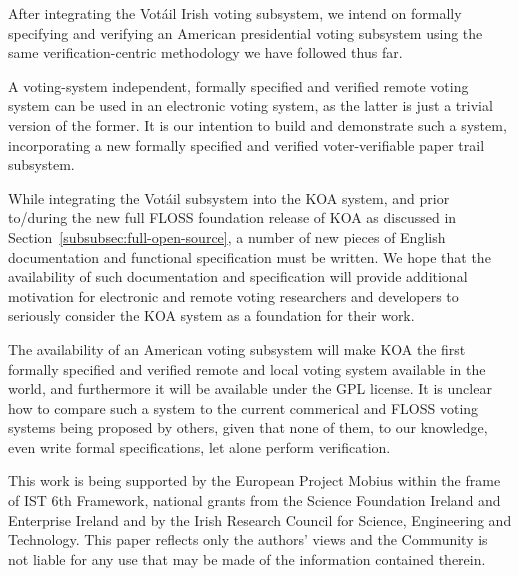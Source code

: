 \documentclass[times, 10pt, twocolumn]{article}
\newcommand{\Votail}{Vot{\'a}il\xspace}
\begin{document}
After integrating the \Votail Irish voting subsystem, we intend on
formally specifying and verifying an American presidential voting
subsystem using the same verification-centric methodology we have
followed thus far.


A voting-system independent, formally specified and verified remote
voting system can be used in an electronic voting system, as the
latter is just a trivial version of the former.  It is our intention
to build and demonstrate such a system, incorporating a new formally
specified and verified voter-verifiable paper trail subsystem.

\label{sec:conclusion}

While integrating the \Votail subsystem into the KOA system, and prior 
to/during the new full FLOSS foundation release of KOA as discussed in 
Section~\ref{subsubsec:full-open-source}, a number of new pieces of English 
documentation and functional specification must be written. We hope that the 
availability of such documentation and specification will provide additional 
motivation for electronic and remote voting researchers and developers to 
seriously consider the KOA system as a foundation for their work.

The availability of an American voting subsystem will make KOA the
first formally specified and verified remote and local voting system
available in the world, and furthermore it will be available under the
GPL license.  It is unclear how to compare such a system to the
current commerical and FLOSS voting systems being proposed by others,
given that none of them, to our knowledge, even write formal
specifications, let alone perform verification.


This work is being supported by the European Project Mobius within the frame of 
IST 6th Framework, national grants from the Science Foundation Ireland and 
Enterprise Ireland and by the Irish Research Council for Science, Engineering 
and Technology.  This paper reflects only the authors' views and the Community 
is not liable for any use that may be made of the information contained therein.



%
% 

\end{document}

